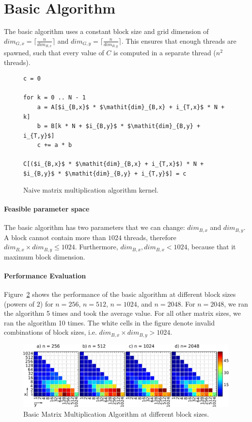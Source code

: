 \documentclass[12pt]{article}
\begin{document}
\section{Basic Algorithm}
The basic algorithm uses a constant block size and grid dimension of $\mathit{dim}_{G,x} = \lceil \frac{n}{\mathit{dim}_{B,x}} \rceil$ and $\mathit{dim}_{G,y} = \lceil \frac{n}{\mathit{dim}_{B,y}} \rceil$. This ensures that enough threads are spawned, such that every value of $C$ is computed in a separate thread ($n^2$ threads).

\begin{figure}[H]
\begin{lstlisting}[mathescape]
c = 0

for k = 0 .. N - 1
	a = A[$i_{B,x}$ * $\mathit{dim}_{B,x} + i_{T,x}$ * N + k]
	b = B[k * N + $i_{B,y}$ * $\mathit{dim}_{B,y} + i_{T,y}$]
	c += a * b

C[($i_{B,x}$ * $\mathit{dim}_{B,x} + i_{T,x}$) * N + $i_{B,y}$ * $\mathit{dim}_{B,y} + i_{T,y}$] = c
\end{lstlisting}
\caption{Naive matrix multiplication algorithm kernel.}
\label{fig:naive_mul}
\end{figure}

\paragraph{Feasible parameter space}
The basic algorithm has two parameters that we can change: $\mathit{dim}_{B,x}$ and $\mathit{dim}_{B,y}$. A block cannot contain more than $1024$ threads, therefore $\mathit{dim}_{B,x} \times \mathit{dim}_{B,y} \leq 1024$. Furthermore, $\mathit{dim}_{B,x}, \mathit{dim}_{B,x} < 1024$, because that it maximum block dimension.

\paragraph{Performance Evaluation}
Figure~\ref{fig:basic_performance} shows the performance of the basic algorithm at different block sizes (powers of $2$) for $n=256$, $n=512$, $n=1024$, and $n=2048$. For $n=2048$, we ran the algorithm 5 times and took the average value. For all other matrix sizes, we ran the algorithm 10 times. The white cells in the figure denote invalid combinations of block sizes, i.e. $\mathit{dim}_{B,x} \times \mathit{dim}_{B,y} > 1024$.

\begin{figure}[H]
\includegraphics[width=\textwidth]{original_heat.pdf}
\caption{Basic Matrix Multiplication Algorithm at different block sizes.}
\label{fig:basic_performance}
\end{figure}
\end{document}

